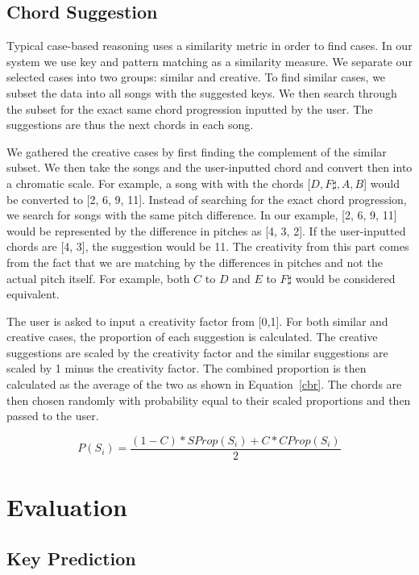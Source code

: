 \documentclass[letterpaper]{article}
\begin{document}
\subsection{Chord Suggestion}

Typical case-based reasoning uses a similarity metric in order to find cases. In our system we use key and pattern matching as a similarity measure. We separate our selected cases into two groups: similar and creative. To find similar cases, we subset the data into all songs with the suggested keys. We then search through the subset for the exact same chord progression inputted by the user. The suggestions are thus the next chords in each song.

We gathered the creative cases by first finding the complement of the similar subset. We then take the songs and the user-inputted chord and convert then into a chromatic scale. For example, a song with with the chords [$D, F\sharp, A, B$] would be converted to [2, 6, 9, 11]. Instead of searching for the exact chord progression, we search for songs with the same pitch difference. In our example, [2, 6, 9, 11] would be represented by the difference in pitches as [4, 3, 2]. If the user-inputted chords are [4, 3], the suggestion would be 11. The creativity from this part comes from the fact that we are matching by the differences in pitches and not the actual pitch itself. For example, both $C$ to $D$ and $E$ to $F\sharp$ would be considered equivalent. 

The user is asked to input a creativity factor from [0,1].
For both similar and creative cases, the proportion of each suggestion is calculated. The creative suggestions are scaled by the creativity factor and the similar suggestions are scaled by 1 minus the creativity factor. The combined proportion is then calculated as the average of the two as shown in Equation~\ref{cbr}. The chords are then chosen randomly with probability equal to their scaled proportions and then passed to the user.

\begin{equation}
P(S_i) = \frac{(1-C)*SProp(S_i)
+ C*CProp(S_i)}{2}
\label{cbr}
\end{equation}


\section{Evaluation}
\subsection{Key Prediction}
\end{document}

